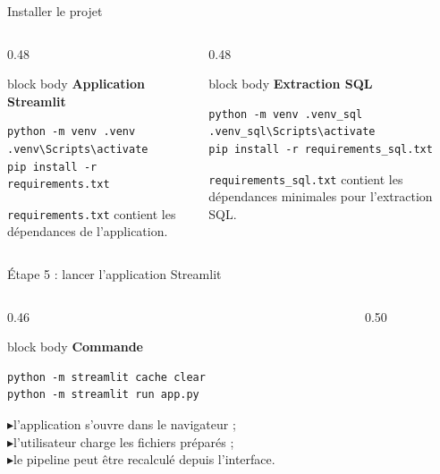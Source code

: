 \documentclass[10pt,aspectratio=169]{beamer}
\newcommand{\smallbullet}{\textcolor{MainBlue}{$\blacktriangleright$}\hspace{0.4em}}
\newenvironment{infobox}[1]
{\begin{beamercolorbox}[rounded=true,shadow=false,wd=\linewidth,sep=0.8em]{block body}
\textbf{\color{DarkBlue}#1}\par\vspace{0.3em}}
{\end{beamercolorbox}}
\begin{document}
\begin{frame}[fragile]{Installer le projet}
\begin{columns}[T,onlytextwidth]
\begin{column}{0.48\linewidth}
\begin{infobox}{Application Streamlit}
\begin{lstlisting}
python -m venv .venv
.venv\Scripts\activate
pip install -r requirements.txt
\end{lstlisting}
\texttt{requirements.txt} contient les dépendances de l'application.
\end{infobox}
\end{column}

\begin{column}{0.48\linewidth}
\begin{infobox}{Extraction SQL}
\begin{lstlisting}
python -m venv .venv_sql
.venv_sql\Scripts\activate
pip install -r requirements_sql.txt
\end{lstlisting}
\texttt{requirements\_sql.txt} contient les dépendances minimales pour l'extraction SQL.
\end{infobox}
\end{column}
\end{columns}
\end{frame}

\begin{frame}[fragile]{Étape 5 : lancer l'application Streamlit}
\begin{columns}[T,onlytextwidth]
\begin{column}{0.46\linewidth}
\begin{infobox}{Commande}
\begin{lstlisting}
python -m streamlit cache clear
python -m streamlit run app.py
\end{lstlisting}

\smallbullet l'application s'ouvre dans le navigateur ;\\
\smallbullet l'utilisateur charge les fichiers préparés ;\\
\smallbullet le pipeline peut être recalculé depuis l'interface.
\end{infobox}
\end{column}

\begin{column}{0.50\linewidth}
\centering
{}
\end{column}
\end{columns}
\end{frame}
\end{document}

